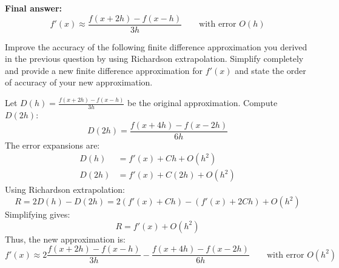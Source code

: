 \documentclass[reqno]{exam}
\begin{document}
\begin{questions}
\begin{solution}
    \textbf{Final answer:}
    \[
      \boxed{
        f'(x) \approx \frac{f(x+2h) - f(x-h)}{3h}
      }
      \qquad \text{with error } O(h)
    \]
  \end{solution}

  \newpage

  \question[8]
  Improve the accuracy of the following finite difference approximation you derived in the previous question by using Richardson extrapolation. Simplify completely and provide a new finite difference approximation for $f'(x)$ and state the order of accuracy of your new approximation.

  \begin{solution}
    Let $D(h) = \frac{f(x+2h) - f(x-h)}{3h}$ be the original approximation. Compute $D(2h)$:
    \[
      D(2h) = \frac{f(x+4h) - f(x-2h)}{6h}
    \]
    The error expansions are:
    \begin{align*}
      D(h) &= f'(x) + C h + O(h^2) \\
      D(2h) &= f'(x) + C (2h) + O(h^2)
    \end{align*}
    Using Richardson extrapolation:
    \[
      R = 2 D(h) - D(2h) = 2\left(f'(x) + C h\right) - \left(f'(x) + 2C h\right) + O(h^2)
    \]
    Simplifying gives:
    \[
      R = f'(x) + O(h^2)
    \]
    Thus, the new approximation is:
    \[
      \boxed{
        f'(x) \approx 2\frac{f(x+2h) - f(x-h)}{3h} - \frac{f(x+4h) - f(x-2h)}{6h}
      }
      \qquad \text{with error } O(h^2)
    \]
  \end{solution}


  \newpage


\end{questions}
\end{document}
